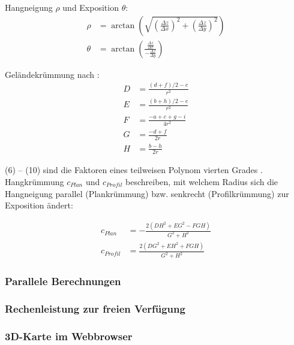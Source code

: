 Hangneigung $\rho$ und Exposition $\theta$:
\begin{align}
  \rho &= \arctan \left( \sqrt{
    \left( \frac{\Delta z}{\Delta x}\right)^2 + 
    \left(\frac{\Delta z}{\Delta y}\right)^2}
  \right)\\
  \theta &= \arctan\left(\frac{\frac{\Delta z}{\Delta x}}{-\frac{\Delta z}{\Delta y}}\right)
\end{align}

Geländekrümmung nach \cite{gismath}:
\begin{align}
  D &= \frac{{(d + f) / 2 - e}}{{r^2}} \\
  E &= \frac{{(b + h) / 2 - e}}{{r^2}} \\
  F &= \frac{{-a + c + g - i}}{{4r^2}} \\
  G &= \frac{{-d + f}}{{2r}} \\
  H &= \frac{{b - h}}{{2r}}
\end{align}

(6) -- (10) sind die Faktoren eines teilweisen Polynom vierten Grades \cite{gismath}.
Hangkrümmung $c_{Plan}$ und $c_{Profil}$ beschreiben, mit welchem Radius sich die Hangneigung parallel (Plankrümmung) bzw. senkrecht (Profilkrümmung) zur Exposition ändert:

\begin{align}
    c_{Plan} &= -\frac{{2(DH^2 + EG^2 - FGH)}}{{G^2 + H^2}}
    \\
    c_{Profil} &= \frac{{2(DG^2 + EH^2 + FGH)}}{{G^2 + H^2}}
\end{align}



\subsubsection{Parallele Berechnungen}
\subsubsection{Rechenleistung zur freien Verfügung}
\subsubsection{3D-Karte im Webbrowser}